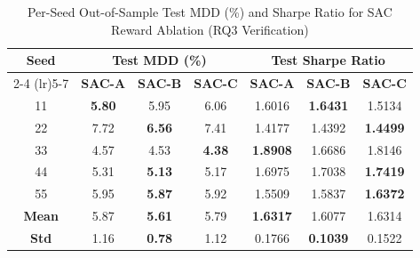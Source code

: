 \documentclass[10pt,twocolumn,conference]{IEEEtran}
\begin{document}
\begin{table}[t]
\centering
\caption{Per-Seed Out-of-Sample Test MDD (\%) and Sharpe Ratio for SAC Reward Ablation (RQ3 Verification)}
\label{tab:seed_ablation}
\begin{tabular}{ccccccc}
\toprule
\multirow{2}{*}{\textbf{Seed}} & \multicolumn{3}{c}{\textbf{Test MDD (\%)}} & \multicolumn{3}{c}{\textbf{Test Sharpe Ratio}} \\
\cmidrule(lr){2-4} \cmidrule(lr){5-7}
 & \textbf{SAC-A} & \textbf{SAC-B} & \textbf{SAC-C} & \textbf{SAC-A} & \textbf{SAC-B} & \textbf{SAC-C} \\
\midrule
11 & \textbf{5.80} & 5.95 & 6.06 & 1.6016 & \textbf{1.6431} & 1.5134 \\
22 & 7.72 & \textbf{6.56} & 7.41 & 1.4177 & 1.4392 & \textbf{1.4499} \\
33 & 4.57 & 4.53 & \textbf{4.38} & \textbf{1.8908} & 1.6686 & 1.8146 \\
44 & 5.31 & \textbf{5.13} & 5.17 & 1.6975 & 1.7038 & \textbf{1.7419} \\
55 & 5.95 & \textbf{5.87} & 5.92 & 1.5509 & 1.5837 & \textbf{1.6372} \\
\midrule
\textbf{Mean} & 5.87 & \textbf{5.61} & 5.79 & \textbf{1.6317} & 1.6077 & 1.6314 \\
\textbf{Std}  & 1.16 & \textbf{0.78} & 1.12 & 0.1766 & \textbf{0.1039} & 0.1522 \\
\bottomrule
\end{tabular}
\end{table}
\end{document}
